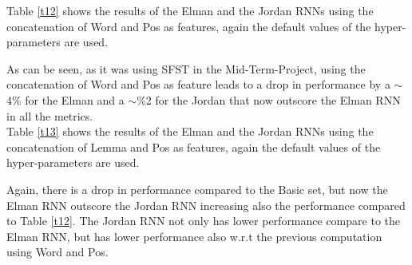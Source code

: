 \documentclass[11pt,a4paper]{article}
\begin{document}
Table \ref{t12} shows the results of the Elman and the Jordan RNNs using the concatenation of Word and Pos as features, again the default values of the hyper-parameters are used.
\begin{table}[H]
    \begin{center}
    \end{center}
    \caption{\label{t12} Rnn Best score on Word + Pos set}
\end{table}
As can be seen, as it was using SFST in the Mid-Term-Project, using the concatenation of Word and Pos as feature leads to a drop in performance by a $\sim$4\% for the Elman and a $\sim$\%2 for the Jordan that now outscore the Elman RNN in all the metrics.\\
Table \ref{t13} shows the results of the Elman and the Jordan RNNs using the concatenation of Lemma and Pos as features, again the default values of the hyper-parameters are used.
\begin{table}[H]
    \begin{center}
    \end{center}
    \caption{\label{t13} Rnn Best score on Lemma + Pos set}
\end{table}
Again, there is a drop in performance compared to the Basic set, but now the Elman RNN outscore the Jordan RNN increasing also the performance compared to Table \ref{t12}. The Jordan RNN not only has lower performance compare to the Elman RNN, but has lower performance also w.r.t the previous computation using Word and Pos.\\
\end{document}
